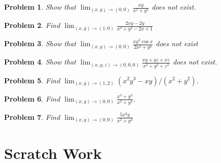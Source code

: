 \documentclass[11pt]{article}
\newtheorem{problem}{Problem}
\begin{document}
\vspace{7.5cm}


\begin{problem}
    Show that $\lim
_{(x,y)\to (0,0)} \frac{xy}{x^2+y^2}$ does not exist.
\end{problem}

\vspace{8.5cm}

\begin{problem}
    Find $\lim_{(x,y)\to (1,0)} \frac{2xy-2y}{x^2+y^2-2x+1}$
\end{problem}

\vspace{6cm}

\begin{problem}
    Show that $\lim_{(x,y) \to (0,0)} \frac{xy^3\cos{x}}{2x^2+y^6}$ does not exist
\end{problem}

\vspace{6cm}

\begin{problem}
    Show that $\lim_{(x,y,z)\to (0,0,0)}\frac{xy+yz+xz}{x^2+y^2+z^2}$ does not exist.
\end{problem}


\vspace{6.5cm}

\begin{problem}
Find $\lim_{(x,y)\to (1,2)} (x^2y^3-xy)/(x^2 + y^2)$.
\end{problem}

\vspace{8cm}

\begin{problem}
    Find $\lim_{(x,y)\to (0,0)} \frac{x^3+y^3}{x^2+y^2}$.
\end{problem}

\vspace{12 cm}

\begin{problem}
    Find $\lim_{(x,y)\to (0,0)} \frac{5x^2y}{x^2+y^2}$
\end{problem}

\vspace{10cm}




\section{Scratch Work}
\end{document}

